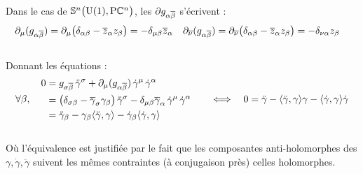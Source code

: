 \\
Dans le cas de $\mathbb{ S}^{n}\big(\text{\normalfont U}(1),\text{\normalfont P}\mathbb{C}^{n}\big)$, les $\partial g_{\alpha \overline{\beta}}$ s'écrivent :
\begin{align*}
	\partial_{\mu} (g_{\alpha \overline{\beta}}) &= \partial_{\mu} \big( \delta_{\alpha \beta} - \overline{z}_\alpha z_\beta \big) = - \delta_{\mu\beta} \overline{z}_\alpha   &  
	\partial_{\overline{\nu}} (g_{\alpha \overline{\beta}}) &= \partial_{\overline{\nu}} \big( \delta_{\alpha \beta} - \overline{z}_\alpha z_\beta \big) = - \delta_{\nu \alpha} z_\beta
\end{align*}
\\
Donnant les équations :
\begin{align*}
	\forall \beta,\quad \begin{aligned}
		0 &= g_{\sigma \overline{\beta}}\, \ddot{\gamma}^\sigma + \partial_{\mu} (g_{\alpha \overline{\beta}}) \, \dot{\gamma}^\mu\, \dot{\gamma}^\alpha \\
		&= \big( \delta_{\sigma \beta} - \overline{\gamma}_\sigma \gamma_\beta \big)\, \ddot{\gamma}^\sigma - \delta_{\mu\beta} \overline{\gamma}_\alpha \, \dot{\gamma}^\mu\, \dot{\gamma}^\alpha \\
		&= \ddot{\gamma}_\beta - \gamma_\beta \langle \ddot{\gamma},\gamma\rangle - \dot{\gamma}_\beta \langle  \dot{\gamma}, \gamma \rangle 
	\end{aligned} \qquad \Longleftrightarrow\quad 
	0 = \ddot{\gamma} -  \langle \ddot{\gamma},\gamma\rangle \gamma -  \langle  \dot{\gamma}, \gamma \rangle \dot{\gamma}
\end{align*}
\\
Où l'équivalence est justifiée par le fait que les composantes anti-holomorphes des $\gamma, \dot{\gamma}, \ddot{\gamma}$ suivent les mêmes contraintes (à conjugaison près) celles holomorphes.


